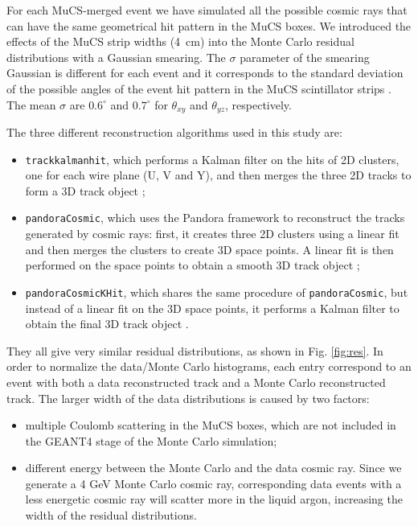 \documentclass[a4paper]{scrartcl}
\begin{document}
For each MuCS-merged event we have simulated all the possible cosmic rays that can have the same geometrical hit pattern in the MuCS boxes. %
We introduced the effects of the MuCS strip widths (4~cm) into the Monte Carlo residual distributions with a Gaussian smearing. The $\sigma$ parameter of the smearing Gaussian is different for each event and it corresponds to the standard deviation of the possible angles of the event hit pattern in the MuCS scintillator strips \cite{mucsextra}. The mean $\sigma$ are $0.6^{\circ}$ and $0.7^{\circ}$ for $\theta_{xy}$ and $\theta_{yz}$, respectively.%

The three different reconstruction algorithms used in this study are:
\begin{itemize}
\item \texttt{track\-kal\-man\-hit}, which performs a Kalman filter \cite{trackkalmanhit} on the hits of 2D clusters, one for each wire plane (U, V and Y), and then merges the three 2D tracks to form a 3D track object \cite{kalmanhit};
\item \texttt{pan\-do\-ra\-Co\-smic}, which uses the Pandora framework \cite{pandora} to reconstruct the tracks generated by cosmic rays: first, it creates three 2D clusters using a linear fit and then merges the clusters to create 3D space points. A linear fit is then performed on the space points to obtain a smooth 3D track object \cite{pandoracosmic};
\item \texttt{pan\-do\-ra\-Co\-smicKHit}, which shares the same procedure of \texttt{pan\-do\-ra\-Co\-smic}, but instead of a linear fit on the 3D space points, it performs a Kalman filter to obtain the final 3D track object \cite{pandoracosmic}.
\end{itemize}

They all give very similar residual distributions, as shown in Fig. \ref{fig:res}. In order to normalize the data/Monte Carlo histograms, each entry correspond to an event with both a data reconstructed track and a Monte Carlo reconstructed track. 
The larger width of the data distributions is caused by two factors:
\begin{itemize}
\item multiple Coulomb scattering in the MuCS boxes, which are not included in the GEANT4 stage of the Monte Carlo simulation;
\item different energy between the Monte Carlo and the data cosmic ray. Since we generate a 4 GeV Monte Carlo cosmic ray, corresponding data events with a less energetic cosmic ray will scatter more in the liquid argon, increasing the width of the residual distributions.
\end{itemize}
\end{document}
